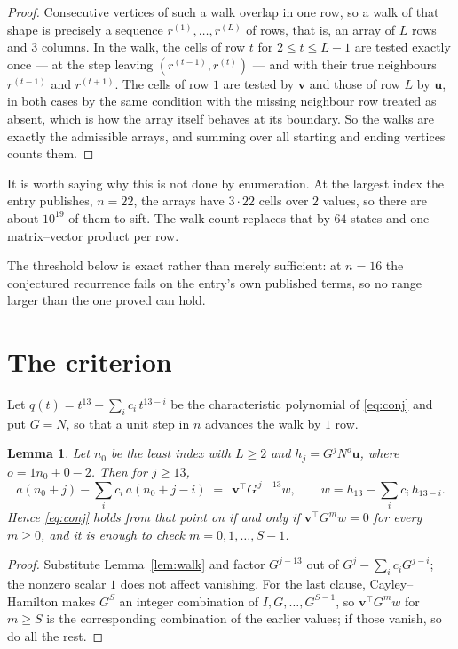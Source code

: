 \documentclass[11pt,a4paper]{article}
\theoremstyle{plain}
\newtheorem{lemma}[theorem]{Lemma}
\theoremstyle{definition}
\begin{document}
\begin{proof}
Consecutive vertices of such a walk overlap in one row, so a walk of that shape is
precisely a sequence $r^{(1)},\dots,r^{(L)}$ of rows, that is, an array of $L$ rows
and $3$ columns. In the walk, the cells of row $t$ for $2\le t\le L-1$ are tested
exactly once --- at the step leaving $(r^{(t-1)},r^{(t)})$ --- and with their true
neighbours $r^{(t-1)}$ and $r^{(t+1)}$. The cells of row $1$ are tested by
$\mathbf{v}$ and those of row $L$ by $\mathbf{u}$, in both cases by the same condition
with the missing neighbour row treated as absent, which is how the array itself behaves at
its boundary. So the walks are exactly the admissible arrays, and summing over all starting
and ending vertices counts them.
\end{proof}


It is worth saying why this is not done by enumeration. At the largest index the entry
publishes, $n=22$, the arrays have $3\cdot22$ cells over
$2$ values, so there are about $10^{19}$ of them to sift. The
walk count replaces that by $64$ states and one matrix--vector product per row.

The threshold below is exact rather than merely sufficient: at $n=16$ the conjectured
recurrence fails on the entry's own published terms, so no range larger than the one proved
can hold.
\section{The criterion}

Let $q(t)=t^{13}-\sum_i c_i\,t^{13-i}$ be the characteristic polynomial of
\eqref{eq:conj} and put $G=N$, so that a unit step in $n$ advances the walk by
$1$ row.

\begin{lemma}\label{lem:crit}
Let $n_0$ be the least index with $L\ge2$ and $h_j=G^{j}N^{o}\mathbf{u}$, where
$o=1n_0+0-2$. Then for $j\ge13$,
\[
a(n_0+j)-\sum_i c_i\,a(n_0+j-i)\;=\;\,\mathbf{v}^{\!\top}G^{\,j-13}w,
\qquad w=h_{13}-\sum_i c_i\,h_{13-i} .
\]
Hence \eqref{eq:conj} holds from that point on if and only if
$\mathbf{v}^{\!\top}G^{m}w=0$ for every $m\ge0$, and it is enough to check
$m=0,1,\dots,S-1$.
\end{lemma}

\begin{proof}
Substitute Lemma~\ref{lem:walk} and factor $G^{j-13}$ out of
$G^{j}-\sum_ic_iG^{j-i}$; the nonzero scalar $1$ does not affect
vanishing. For the last clause, Cayley--Hamilton makes $G^{S}$ an integer combination of
$I,G,\dots,G^{S-1}$, so $\mathbf{v}^{\!\top}G^{m}w$ for $m\ge S$ is the corresponding
combination of the earlier values; if those vanish, so do all the rest.
\end{proof}
\end{document}
